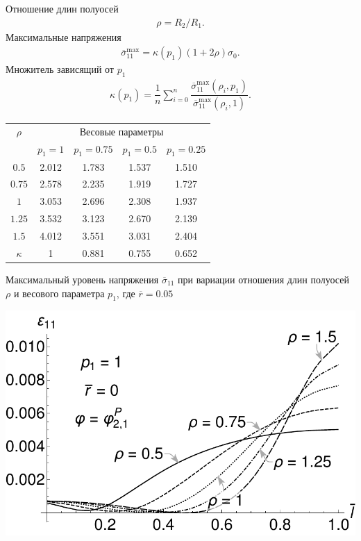\begin{frame}
\begin{minipage}{0.59\textwidth}
	Отношение длин полуосей
	\begin{gather*}
		\rho = R_2 / R_1.
	\end{gather*}
	Максимальные напряжения
	\begin{gather*}
		\overline{\sigma}_{11}^{\max} = \kappa (p_1) \left( 1 + 2 \rho \right) \sigma_0.
	\end{gather*}	
	Множитель зависящий от $p_1$
	\begin{gather*}
		\kappa (p_1) = \dfrac{1}{n} \sum\limits_{i = 0}^{n} \dfrac{\overline{\sigma}_{11}^{\max} (\rho_i, p_1)}{\overline{\sigma}_{11}^{\max} (\rho_i, 1)}.
	\end{gather*}

	\tiny
	\centering
	\begin{tabular}{|c|c|c|c|c|}
		\hline
		          $\rho$  & \multicolumn{4}{c|}{Весовые параметры} \\
		\cline{2-5}
		                  & $p_1 = 1$ & $p_1 = 0.75$ & $p_1 = 0.5$ & $p_1 = 0.25$ \\
		\hline
		$0.5$             & 2.012     & 1.783        & 1.537       & 1.510 \\
		\hline
		$0.75$            & 2.578     & 2.235        & 1.919       & 1.727 \\
		\hline
		$1$               & 3.053     & 2.696        & 2.308       & 1.937 \\
		\hline
		$1.25$            & 3.532     & 3.123        & 2.670       & 2.139 \\
		\hline
		$1.5$             & 4.012     & 3.551        & 3.031       & 2.404 \\
		\hline
		$\kappa$ & 1         & 0.881        & 0.755       & 0.652 \\
		\hline
	\end{tabular}
	Максимальный уровень напряжения $\overline{\sigma}_{11}$ при вариации отношения длин полуосей $\rho$ и весового параметра $p_1$, где $\overline{r} = 0.05$
\end{minipage}
\begin{minipage}{0.39\textwidth}
	\centering
	\includegraphics[width=\textwidth]{pics/KirshABEps11Local.pdf} \\

\end{minipage}
\end{frame}
